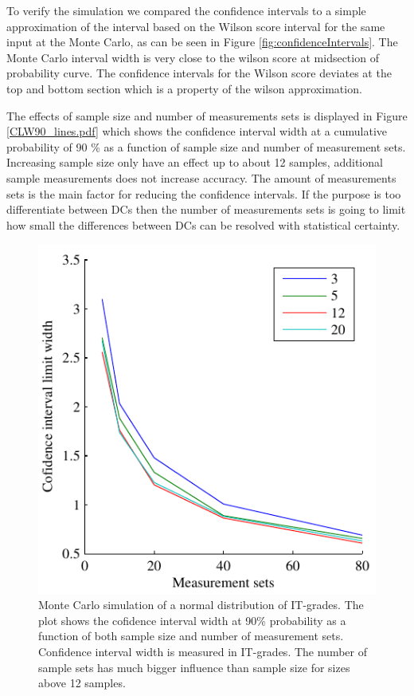 \documentclass[aip,amsmath, reprint, author-year]{revtex4-1}
\begin{document}
To verify the simulation we compared the confidence intervals to a simple approximation of the interval based on the Wilson score interval for the same input at the Monte Carlo, as can be seen in Figure \ref{fig:confidenceIntervals}. The Monte Carlo interval width is very close to the wilson score at midsection of probability curve. 
The confidence intervals for the Wilson score deviates at the top and bottom section which is a property of the wilson approximation.

The effects of sample size and number of measurements sets is displayed in Figure \ref{CLW90_lines.pdf} which shows the confidence interval width at a cumulative probability of 90 \% as a function of sample size and number of measurement sets. 
Increasing sample size only have an effect up to about 12 samples, additional sample measurements does not increase accuracy. 
The amount of measurements sets is the main factor for reducing the confidence intervals. 
If the purpose is too differentiate between DCs then the number of measurements sets is going to limit how small the differences between DCs can be resolved with statistical certainty.

\begin{figure}
\includegraphics{CLW90_lines.pdf}
\caption{\label{fig:cl_line} Monte Carlo simulation of a normal distribution of IT-grades. The plot shows the cofidence interval width at 90\% probability as a function of both sample size and number of measurement sets. 
Confidence interval width is measured in IT-grades. 
The number of sample sets has much bigger influence than sample size for sizes above 12 samples.}
\end{figure}
\end{document}
